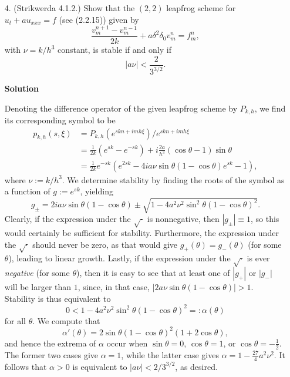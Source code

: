 \documentclass{article}
\providecommand{\abs}[1]{\left\lvert#1\right\rvert}
\begin{document}
\begin{itemize}
\item[4.] (Strikwerda 4.1.2.) Show that the $(2,2)$ leapfrog scheme for $u_t + a u_{xxx} = f$ (see (2.2.15)) given by
\begin{equation*}
\frac{v^{n+1}_m - v^{n-1}_m}{2k} + a \delta^2 \delta_0 v^n_m = f^n_m,
\end{equation*}
with $\nu = k / h^3$ constant, is stable if and only if
\begin{equation*}
\abs{a \nu} < \frac{2}{3^{3/2}}.
\end{equation*}

\textbf{Solution}

Denoting the difference operator of the given leapfrog scheme by $P_{k,h}$, we find its corresponding symbol to be
\begin{align*}
p_{k,h}(s,\xi) & = P_{k,h} \left( e^{skn + imh\xi} \right) / e^{skn + imh\xi} \\
               & = \frac{1}{2k} \left( e^{sk} - e^{-sk} \right) + i \frac{2a}{h^3} \left( \cos \theta - 1 \right) \sin \theta \\
               & = \frac{1}{2k} e^{-sk} \left( e^{2sk} - 4 i a \nu \sin \theta \left( 1 - \cos \theta \right) e^{sk} - 1 \right),
\end{align*}
where $\nu := k/h^3$. We determine stability by finding the roots of the symbol as a function of $g := e^{sk}$, yielding
\begin{equation*}
g_{\pm} = 2 i a \nu \sin \theta \left( 1 - \cos \theta \right) \pm \sqrt{1 - 4 a^2 \nu^2 \sin^2 \theta \left( 1 - \cos \theta \right)^2}.
\end{equation*}
Clearly, if the expression under the $\sqrt{\cdot}$ is nonnegative, then $\abs{g_{\pm}} \equiv 1$, so this would certainly be sufficient for stability. Furthermore, the expression under the $\sqrt{\cdot}$ should never be zero, as that would give $g_+(\theta) = g_-(\theta)$ (for some $\theta$), leading to linear growth. Lastly, if the expression under the $\sqrt{\cdot}$ is ever \emph{negative} (for some $\theta$), then it is easy to see that at least one of $\abs{g_+}$ or $\abs{g_-}$ will be larger than $1$, since, in that case, $\abs{2 a \nu \sin \theta \left( 1 - \cos \theta \right)} > 1$. Stability is thus equivalent to
\begin{equation*}
0 < 1 - 4 a^2 \nu^2 \sin^2 \theta \left( 1 - \cos \theta \right)^2 =: \alpha(\theta)
\end{equation*}
for all $\theta$. We compute that
\begin{equation*}
\alpha'(\theta) = 2 \sin \theta \left( 1 - \cos \theta \right)^2 \left( 1 + 2 \cos \theta \right),
\end{equation*}
and hence the extrema of $\alpha$ occur when $\sin \theta = 0$, $\cos \theta = 1$, or $\cos \theta = -\frac{1}{2}$. The former two cases give $\alpha = 1$, while the latter case gives $\alpha = 1 - \frac{27}{4} a^2 \nu^2$. It follows that $\alpha > 0$ is equivalent to $\abs{a \nu} < 2/3^{3/2}$, as desired.


\end{itemize}
\end{document}
